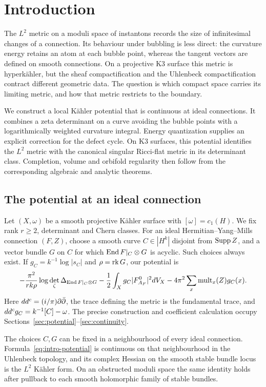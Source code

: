 \section{Introduction}

The $L^2$ metric on a moduli space of instantons records the size of
infinitesimal changes of a connection. Its behaviour under bubbling is
less direct: the curvature energy retains an atom at each bubble point,
whereas the tangent vectors are defined on smooth connections.
On a projective K3 surface this metric is hyperk\"ahler, but the sheaf
compactification and the Uhlenbeck compactification contract different
geometric data. The question is which compact space carries its limiting
metric, and how that metric restricts to the boundary.

We construct a local K\"ahler potential that is continuous at ideal
connections. It combines a zeta determinant on a curve avoiding the bubble
points with a logarithmically weighted curvature integral. Energy
quantization supplies an explicit correction for the defect cycle.
On K3 surfaces, this potential identifies the $L^2$ metric with the
canonical singular Ricci-flat metric in its determinant class. Completion,
volume and orbifold regularity then follow from the corresponding
algebraic and analytic theorems.

\subsection{The potential at an ideal connection}
Let $(X,\omega)$ be a smooth projective K\"ahler surface with
$[\omega]=c_1(H)$. We fix rank $r\ge2$, determinant and Chern classes.
For an ideal Hermitian--Yang--Mills connection $(F,Z)$, choose a smooth
curve $C\in|H^k|$ disjoint from $\operatorname{Supp} Z$, and a vector bundle $G$ on $C$
for which $\operatorname{End} F|_C\otimes G$ is acyclic. Such choices always exist.
If $g_C=k^{-1}\log|s_C|$ and $\rho=\operatorname{rk} G$, our potential is
\begin{equation}\label{eq:intro-potential}
 -\frac{\pi^2}{rk\rho}\log\det_\zeta\Delta_{\operatorname{End} F|_C\otimes G}
 -\frac12\int_X g_C|F_{A_F}^0|^2dV_X
 -4\pi^2\sum_x\operatorname{mult}_x(Z)g_C(x).
\end{equation}
Here $dd^c=(i/\pi)\partial\bar\partial$, the trace defining the metric
is the fundamental trace, and $dd^c g_C=k^{-1}[C]-\omega$.
The precise construction and coefficient calculation occupy
Sections~\ref{sec:potential}--\ref{sec:continuity}.

\begin{theorem}\label{thm:intro-potential}
The choices $C,G$ can be fixed in a neighbourhood of every ideal
connection. Formula~\eqref{eq:intro-potential} is continuous on that
neighbourhood in the Uhlenbeck topology, and its complex Hessian on the
smooth stable bundle locus is the $L^2$ K\"ahler form. On an obstructed
moduli space the same identity holds after pullback to each smooth
holomorphic family of stable bundles.
\end{theorem}

